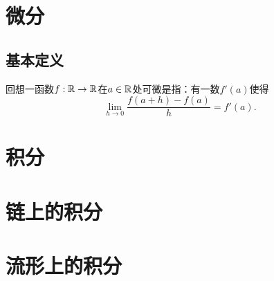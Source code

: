 \chapter{微分}\label{chapter00902}
\section{基本定义}\label{section0090201}
回想一函数$f: \mathbb{R} \to \mathbb{R}$在$a \in \mathbb{R}$处可微是指：有一数$f'(a)$使得
\begin{equation}\label{equ009020101}
\lim_{h \to 0}{\frac{f(a+h) - f(a)}{h}} = f'(a).
\end{equation}



\chapter{积分}\label{chapter00903}




\chapter{链上的积分}\label{chapter00904}




\chapter{流形上的积分}\label{chapter00905}

